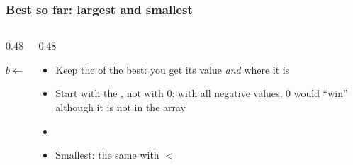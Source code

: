 \documentclass[aspectratio=169,10pt,compress]{beamer}
\begin{document}
\begin{frame}[t,fragile] \frametitle{Best so far: largest and smallest}
	\begin{columns}[T]
		\begin{column}{0.48\textwidth}
			\SetAlFnt{\small}


\begin{algorithm}[H]
				\caption{IndexOfMax($a$), $n \ge 1$}
				$b \gets 0$ 
				\;
\end{algorithm}

		\end{column}
		\begin{column}{0.48\textwidth}
			\begin{center}
			\end{center}
			\begin{itemize}\small
				\item Keep the  of the best: you get its value \emph{and} where it is
				\item Start with the , not with 0: with all negative
				      values, 0 would ``win'' although it is not in the array
				\item {}
				\item Smallest: the same with $<$
			\end{itemize}
		\end{column}
	\end{columns}
\end{frame}
\end{document}
